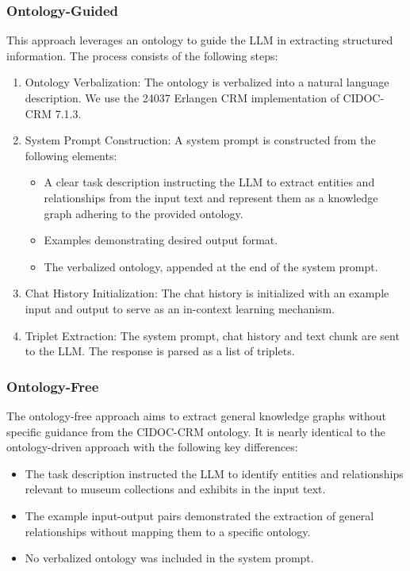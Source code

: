 \documentclass[a4, conference]{IEEEtran}
\begin{document}
\subsubsection{Ontology-Guided}

This approach leverages an ontology to guide the LLM in extracting structured information. The process consists of the following steps:

\begin{enumerate}
    \item Ontology Verbalization: The ontology is verbalized into a natural language description. We use the 24037 Erlangen CRM implementation of CIDOC-CRM 7.1.3.
    \item System Prompt Construction: A system prompt is constructed from the following elements:
          \begin{itemize}
              \item A clear task description instructing the LLM to extract entities and relationships from the input text and represent them as a knowledge graph adhering to the provided ontology.
              \item Examples demonstrating desired output format.
              \item The verbalized ontology, appended at the end of the system prompt.
          \end{itemize}
    \item Chat History Initialization: The chat history is initialized with an example input and output to serve as an in-context learning mechanism.
    \item Triplet Extraction: The system prompt, chat history and text chunk are sent to the LLM. The response is parsed as a list of triplets.
\end{enumerate}

\subsubsection{Ontology-Free}

The ontology-free approach aims to extract general knowledge graphs without specific guidance from the CIDOC-CRM ontology. It is nearly identical to the ontology-driven approach with the following key differences:

\begin{itemize}
    \item The task description instructed the LLM to identify entities and relationships relevant to museum collections and exhibits in the input text.
    \item The example input-output pairs demonstrated the extraction of general relationships without mapping them to a specific ontology.
    \item No verbalized ontology was included in the system prompt.
\end{itemize}
\end{document}
